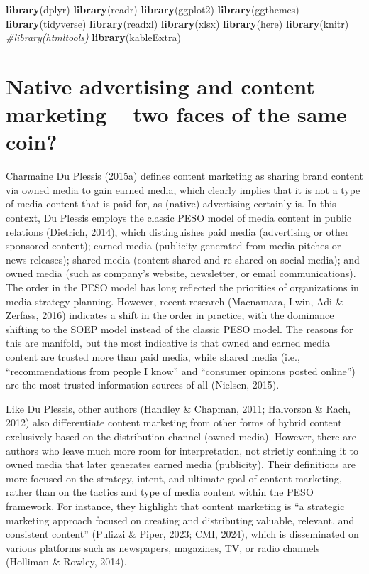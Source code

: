 \documentclass[preprint, 3p,
authoryear]{elsarticle} %
\newenvironment{Shaded}{\begin{snugshade}}{\end{snugshade}}
\newcommand{\CommentTok}[1]{\textcolor[rgb]{0.56,0.35,0.01}{\textit{#1}}}
\newcommand{\FunctionTok}[1]{\textcolor[rgb]{0.13,0.29,0.53}{\textbf{#1}}}
\newcommand{\NormalTok}[1]{#1}
\begin{document}
\begin{Shaded}
\begin{Highlighting}[]
\FunctionTok{library}\NormalTok{(dplyr)}
\FunctionTok{library}\NormalTok{(readr)}
\FunctionTok{library}\NormalTok{(ggplot2)}
\FunctionTok{library}\NormalTok{(ggthemes)}
\FunctionTok{library}\NormalTok{(tidyverse)}
\FunctionTok{library}\NormalTok{(readxl)}
\FunctionTok{library}\NormalTok{(xlsx)}
\FunctionTok{library}\NormalTok{(here)}
\FunctionTok{library}\NormalTok{(knitr)}
\CommentTok{\#library(htmltools)}
\FunctionTok{library}\NormalTok{(kableExtra)}
\end{Highlighting}
\end{Shaded}

\hypertarget{native-advertising-and-content-marketing-two-faces-of-the-same-coin}{%
\section{Native advertising and content marketing -- two faces of the
same
coin?}\label{native-advertising-and-content-marketing-two-faces-of-the-same-coin}}

Charmaine Du Plessis (2015a) defines content marketing as sharing brand
content via owned media to gain earned media, which clearly implies that
it is not a type of media content that is paid for, as (native)
advertising certainly is. In this context, Du Plessis employs the
classic PESO model of media content in public relations (Dietrich,
2014), which distinguishes paid media (advertising or other sponsored
content); earned media (publicity generated from media pitches or news
releases); shared media (content shared and re-shared on social media);
and owned media (such as company's website, newsletter, or email
communications). The order in the PESO model has long reflected the
priorities of organizations in media strategy planning. However, recent
research (Macnamara, Lwin, Adi \& Zerfass, 2016) indicates a shift in
the order in practice, with the dominance shifting to the SOEP model
instead of the classic PESO model. The reasons for this are manifold,
but the most indicative is that owned and earned media content are
trusted more than paid media, while shared media (i.e.,
``recommendations from people I know'' and ``consumer opinions posted
online'') are the most trusted information sources of all (Nielsen,
2015).

Like Du Plessis, other authors (Handley \& Chapman, 2011; Halvorson \&
Rach, 2012) also differentiate content marketing from other forms of
hybrid content exclusively based on the distribution channel (owned
media). However, there are authors who leave much more room for
interpretation, not strictly confining it to owned media that later
generates earned media (publicity). Their definitions are more focused
on the strategy, intent, and ultimate goal of content marketing, rather
than on the tactics and type of media content within the PESO framework.
For instance, they highlight that content marketing is ``a strategic
marketing approach focused on creating and distributing valuable,
relevant, and consistent content'' (Pulizzi \& Piper, 2023; CMI, 2024),
which is disseminated on various platforms such as newspapers,
magazines, TV, or radio channels (Holliman \& Rowley, 2014).
\end{document}
